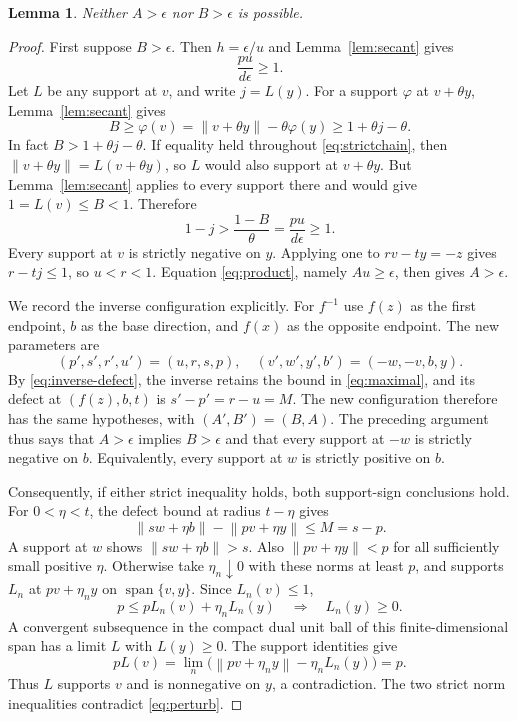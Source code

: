 \documentclass[11pt]{article}
\newtheorem{lemma}[theorem]{Lemma}
\theoremstyle{remark}
\newcommand{\norm}[1]{\left\lVert#1\right\rVert}
\begin{document}
\begin{lemma}\label{lem:large}
Neither $A>\epsilon$ nor $B>\epsilon$ is possible.
\end{lemma}
\begin{proof}
First suppose $B>\epsilon$. Then $h=\epsilon/u$ and Lemma~\ref{lem:secant} gives
\begin{equation}\label{eq:product}
\frac{pu}{d\epsilon}\ge1.
\end{equation}
Let $L$ be any support at $v$, and write $j=L(y)$. For a support $\varphi$ at $v+\theta y$, Lemma~\ref{lem:secant} gives
\begin{equation}\label{eq:strictchain}
B\ge\varphi(v)=\norm{v+\theta y}-\theta\varphi(y)
\ge1+\theta j-\theta.
\end{equation}
In fact $B>1+\theta j-\theta$. If equality held throughout \eqref{eq:strictchain}, then $\norm{v+\theta y}=L(v+\theta y)$, so $L$ would also support at $v+\theta y$. But Lemma~\ref{lem:secant} applies to every support there and would give $1=L(v)\le B<1$. Therefore
\[
1-j>\frac{1-B}{\theta}=\frac{pu}{d\epsilon}\ge1.
\]
Every support at $v$ is strictly negative on $y$. Applying one to $rv-ty=-z$ gives $r-tj\le1$, so $u<r<1$. Equation \eqref{eq:product}, namely $Au\ge\epsilon$, then gives $A>\epsilon$.

We record the inverse configuration explicitly. For $f^{-1}$ use $f(z)$ as the first endpoint, $b$ as the base direction, and $f(x)$ as the opposite endpoint. The new parameters are
\begin{equation}\label{eq:inverse}
(p',s',r',u')=(u,r,s,p),\quad
(v',w',y',b')=(-w,-v,b,y).
\end{equation}
By \eqref{eq:inverse-defect}, the inverse retains the bound in \eqref{eq:maximal}, and its defect at $(f(z),b,t)$ is $s'-p'=r-u=M$. The new configuration therefore has the same hypotheses, with $(A',B')=(B,A)$. The preceding argument thus says that $A>\epsilon$ implies $B>\epsilon$ and that every support at $-w$ is strictly negative on $b$. Equivalently, every support at $w$ is strictly positive on $b$.

Consequently, if either strict inequality holds, both support-sign conclusions hold. For $0<\eta<t$, the defect bound at radius $t-\eta$ gives
\begin{equation}\label{eq:perturb}
\norm{sw+\eta b}-\norm{pv+\eta y}\le M=s-p.
\end{equation}
A support at $w$ shows $\norm{sw+\eta b}>s$. Also $\norm{pv+\eta y}<p$ for all sufficiently small positive $\eta$. Otherwise take $\eta_n\downarrow0$ with these norms at least $p$, and supports $L_n$ at $pv+\eta_n y$ on $\operatorname{span}\{v,y\}$. Since $L_n(v)\le1$,
\[
p\le pL_n(v)+\eta_n L_n(y)\quad\Longrightarrow\quad L_n(y)\ge0.
\]
A convergent subsequence in the compact dual unit ball of this finite-dimensional span has a limit $L$ with $L(y)\ge0$. The support identities give
\[
pL(v)=\lim_n\bigl(\norm{pv+\eta_n y}-\eta_n L_n(y)\bigr)=p.
\]
Thus $L$ supports $v$ and is nonnegative on $y$, a contradiction. The two strict norm inequalities contradict \eqref{eq:perturb}.
\end{proof}
\end{document}

